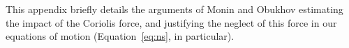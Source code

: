 \label{appendix:coriolis}

This appendix briefly details the arguments of Monin and
Obukhov\cite{monin1954basic} estimating the impact of the Coriolis
force, and justifying the neglect of this force in our equations of
motion (Equation~\ref{eq:ns}, in particular). 